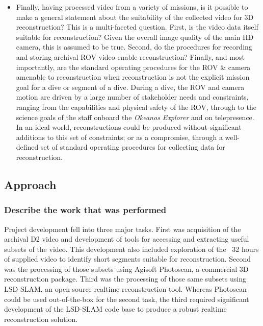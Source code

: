 \documentclass[letterpaper,12pt]{article}
\begin{document}
\begin{itemize}
    \item Finally, having processed video from a variety of missions, is it possible to make a general statement about the suitability of the collected video for 3D reconstruction?  This is a multi-faceted question.  First, is the video data itself suitable for reconstruction?  Given the overall image quality of the main HD camera, this is assumed to be true.  Second, do the procedures for recording and storing archival ROV video enable reconstruction?   Finally, and most importantly, are the standard operating procedures for the ROV \& camera amenable to reconstruction when reconstruction is not the explicit mission goal for a dive or segment of a dive.  During a dive, the ROV and camera motion are driven by a large number of stakeholder needs and constraints, ranging from the capabilities and physical safety of the ROV, through to the science goals of the staff onboard the \textit{Okeanos Explorer} and on telepresence.  In an ideal world, reconstructions could be produced without significant additions to this set of constraints; or as a compromise, through a well-defined set of standard operating procedures for collecting data for reconstruction.  
    
\end{itemize}



\subsection{Approach}
\subsubsection*{Describe the work that was performed}

Project development fell into three major tasks.  First was acquisition of the archival D2 video and development of tools for accessing and extracting useful subsets of the video.  This development also included exploration of the ~32 hours of supplied video to identify short segments suitable for reconstruction.   Second was the processing of those subsets using Agisoft Photoscan, a commercial 3D reconstruction package.   Third was the processing of those same subsets using LSD-SLAM, an open-source realtime reconstruction tool.  Whereas Photoscan could be used out-of-the-box for the second task, the third required significant development of the LSD-SLAM code base to produce a robust realtime reconstruction solution.  
\end{document}
